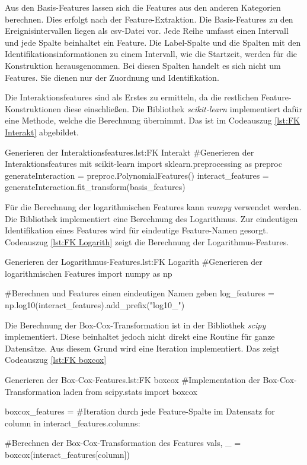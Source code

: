 Aus den Basis-Features lassen sich die Features aus den anderen Kategorien berechnen. Dies erfolgt nach der Feature-Extraktion. Die Basis-Features zu den Ereignisintervallen liegen als csv-Datei vor. Jede Reihe umfasst einen Intervall und jede Spalte beinhaltet ein Feature. Die Label-Spalte und die Spalten mit den Identifikationsinformationen zu einem Intervall, wie die Startzeit, werden für die Konstruktion herausgenommen. Bei diesen Spalten handelt es sich nicht um Features. Sie dienen nur der Zuordnung und Identifikation. \par

Die Interaktionsfeatures sind als Erstes zu ermitteln, da die restlichen Feature-Konstruktionen diese einschließen. Die Bibliothek \textit{scikit-learn} implementiert dafür eine Methode, welche die Berechnung übernimmt. Das ist im Codeauszug \ref{lst:FK Interakt} abgebildet. 

\begin{pythoncode}{Generieren der Interaktionsfeatures.}{lst:FK Interakt}
#Generieren der Interaktionsfeatures mit scikit-learn
import sklearn.preprocessing as preproc
generateInteraction = preproc.PolynomialFeatures()
interact_features = generateInteraction.fit_transform(basis_features)
\end{pythoncode}

Für die Berechnung der logarithmischen Features kann \textit{numpy} verwendet werden. Die Bibliothek implementiert eine Berechnung des Logarithmus. Zur eindeutigen Identifikation eines Features wird für eindeutige Feature-Namen gesorgt. Codeauszug \ref{lst:FK Logarith} zeigt die Berechnung der Logarithmus-Features.

\begin{pythoncode}{Generieren der Logarithmus-Features.}{lst:FK Logarith}
#Generieren der logarithmischen Features
import numpy as np

#Berechnen und Features einen eindeutigen Namen geben
log_features = np.log10(interact_features).add_prefix("log10_") 
\end{pythoncode}

Die Berechnung der Box-Cox-Transformation ist in der Bibliothek \textit{scipy} implementiert. Diese beinhaltet jedoch nicht direkt eine Routine für ganze Datensätze. Aus diesem Grund wird eine Iteration implementiert. Das zeigt Codeauszug \ref{lst:FK boxcox}

\begin{pythoncode}{Generieren der Box-Cox-Features.}{lst:FK boxcox}
#Implementation der Box-Cox-Transformation laden
from scipy.stats import boxcox

boxcox_features = {}
#Iteration durch jede Feature-Spalte im Datensatz
for column in interact_features.columns:   
        
        #Berechnen der Box-Cox-Transformation des Features
        vals, _ = boxcox(interact_features[column])
\end{pythoncode}

